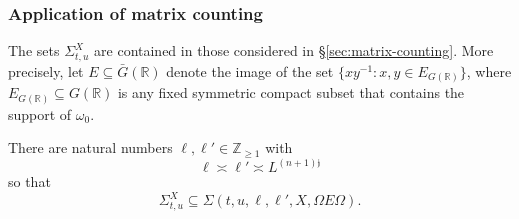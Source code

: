 \subsubsection{Application of matrix counting}
The sets $\Sigma_{t,u}^X$ are contained in those considered in \S\ref{sec:matrix-counting}.  More precisely, let $E \subseteq \bar{G}(\mathbb{R})$ denote the image of the set $\{x y^{-1} : x,y \in E_{G(\mathbb{R})}\}$, where $E_{G(\mathbb{R})} \subseteq G(\mathbb{R})$ is any fixed symmetric compact subset that contains the support of $\omega_0$.
\begin{lemma}
  There are natural numbers $\ell, \ell' \in \mathbb{Z}_{\geq 1}$ with
  \begin{equation}\label{eq:ell-asymp-ell}
    \ell \asymp \ell ' \asymp L^{(n+1) \mathfrak{j}}
  \end{equation}
  so that
  \begin{equation}\label{eq:sigma_t-ux-subseteq}
    \Sigma_{t,u}^X \subseteq \Sigma(t,u,\ell, \ell', X, \Omega E \Omega).
  \end{equation}
\end{lemma}

